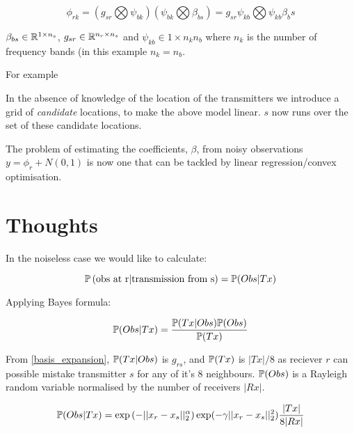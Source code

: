 \documentclass{article}
\begin{document}
\begin{equation}
\phi_{rk} = \left( g_{sr} \bigotimes \psi_{bk} \right)\left(\psi_{bk} \bigotimes \beta_{bs}\right) = g_{sr}\psi_{kb} \bigotimes \psi_{kb}\beta_bs
\end{equation}

\(\beta_{bs} \in {\mathbb{R}}^{1 \times n_s}\), \(g_{sr} \in {\mathbb{R}}^{n_r \times n_s}\) and \(\psi_{kb} \in 1 \times n_kn_b\) where \(n_k\) is the number of frequency bands (in this example \(n_k = n_b\).

For example

In the absence of knowledge of the location of the transmitters we introduce a grid of \textit{candidate} locations, to make the above model linear. \(s\) now runs over the set of these candidate locations.

The problem of estimating the coefficients, \(\beta\), from noisy observations \(y = \phi_r + N\left(0,1\right)\) is now one that can be tackled by linear regression/convex optimisation.

\section{Thoughts}
In the noiseless case we would like to calculate:

\begin{equation}
{\mathbb{P}}\left(\text{obs at r} | \text{transmission from s}\right) = {\mathbb{P}}(Obs | Tx)
\end{equation}

Applying Bayes formula:

\begin{equation}
{\mathbb{P}}(Obs | Tx) = \frac{{\mathbb{P}}(Tx | Obs) {\mathbb{P}}(Obs)}{{\mathbb{P}}(Tx)}
\end{equation}

From \ref{basis_expansion}, \({\mathbb{P}}(Tx | Obs)\) is \(g_{rs}\), and \({\mathbb{P}}(Tx)\) is \(|Tx|/8\) as reciever \(r\) can possible mistake transmitter \(s\) for any of it's 8 neighbours. \({\mathbb{P}}(Obs)\) is a Rayleigh random variable normalised by the number of receivers \(|Rx|\). 

\begin{equation}
{\mathbb{P}}(Obs | Tx) = \exp\left(-||x_r - x_s||_2^\alpha\right) \exp(-\gamma ||x_r - x_s||_2^2) \frac{|Tx|}{8|Rx|}
\end{equation}
\end{document}
